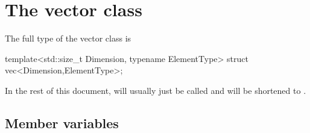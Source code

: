 \documentclass[12pt,a4paper]{report}
\begin{document}
\section{The vector class \label{SEC:core:vec}}

The full type of the vector class is
\begin{cppcode}
template<std::size_t Dimension, typename ElementType>
struct vec<Dimension,ElementType>;
\end{cppcode}

In the rest of this document,  will usually just be called  and  will be shortened to .

\subsection{Member variables \label{SEC:core:vec:member_var}}
\end{document}
